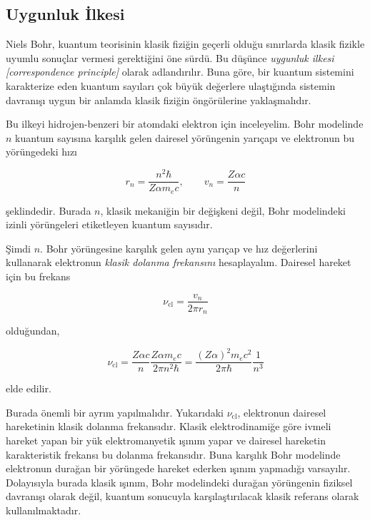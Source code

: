 \documentclass[00_kitap.tex]{subfiles}
\begin{document}



\subsection{Uygunluk İlkesi}

Niels Bohr, kuantum teorisinin klasik fiziğin geçerli olduğu sınırlarda klasik 
fizikle uyumlu sonuçlar vermesi gerektiğini öne sürdü. Bu düşünce 
\emph{uygunluk ilkesi [correspondence principle]} olarak adlandırılır. Buna göre,
bir kuantum sistemini karakterize eden kuantum sayıları çok büyük değerlere
ulaştığında sistemin davranışı uygun bir anlamda klasik fiziğin öngörülerine
yaklaşmalıdır.

Bu ilkeyi hidrojen-benzeri bir atomdaki elektron için inceleyelim. Bohr modelinde
$n$ kuantum sayısına karşılık gelen dairesel yörüngenin yarıçapı ve elektronun
bu yörüngedeki hızı

\begin{equation}
	r_n=\frac{n^2\hbar}{Z\alpha m_e c},
	\qquad
	v_n=\frac{Z\alpha c}{n}
\end{equation}

şeklindedir. Burada $n$, klasik mekaniğin bir değişkeni değil, Bohr modelindeki
izinli yörüngeleri etiketleyen kuantum sayısıdır.

Şimdi $n$. Bohr yörüngesine karşılık gelen aynı yarıçap ve hız değerlerini
kullanarak elektronun \emph{klasik dolanma frekansını} hesaplayalım. Dairesel
hareket için bu frekans

\begin{equation}
	\nu_{\mathrm{cl}}
	=
	\frac{v_n}{2\pi r_n}
\end{equation}

olduğundan,

\begin{equation}
	\nu_{\mathrm{cl}}
	=
	\frac{Z\alpha c}{n}
	\frac{Z\alpha m_e c}{2\pi n^2\hbar}
	=
	\frac{(Z\alpha)^2m_ec^2}{2\pi\hbar}
	\frac{1}{n^3}
\end{equation}

elde edilir.

Burada önemli bir ayrım yapılmalıdır. Yukarıdaki $\nu_{\mathrm{cl}}$, elektronun
dairesel hareketinin klasik dolanma frekansıdır. Klasik elektrodinamiğe göre
ivmeli hareket yapan bir yük elektromanyetik ışınım yapar ve dairesel hareketin
karakteristik frekansı bu dolanma frekansıdır. Buna karşılık Bohr modelinde
elektronun durağan bir yörüngede hareket ederken ışınım yapmadığı varsayılır.
Dolayısıyla burada klasik ışınım, Bohr modelindeki durağan yörüngenin fiziksel
davranışı olarak değil, kuantum sonucuyla karşılaştırılacak klasik referans
olarak kullanılmaktadır.
\end{document}
